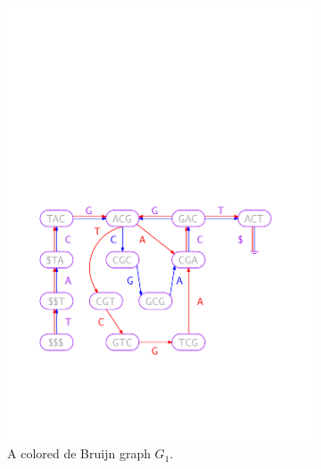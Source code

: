 \begin{figure}[h!t]


\begin{subfigure}[b]{0.45\textwidth}
\includegraphics[width=1.0\textwidth]{varimerge/purplegraph.pdf}
\caption{A colored de Bruijn graph $G_1$.}
\end{subfigure}~\begin{subfigure}[b]{0.45\textwidth}


\end{subfigure}
\end{figure}
